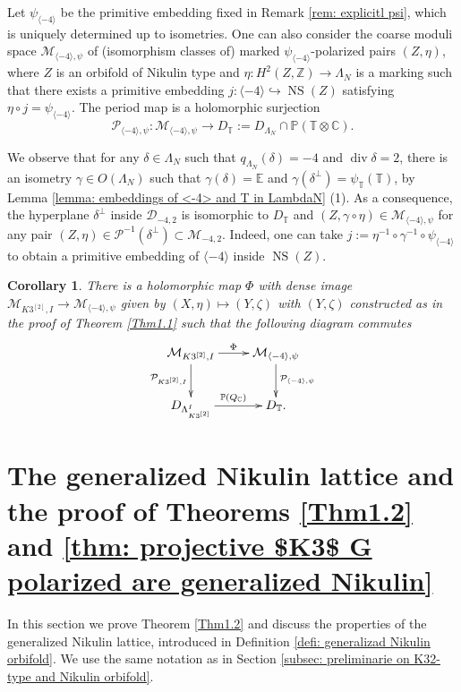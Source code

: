 \documentclass{amsart}
\newtheorem{corollary}[thm]{Corollary}
\theoremstyle{definition}
\numberwithin{equation}{section}
\numberwithin{equation}{section} \theoremstyle{definition}
\DeclareMathOperator{\NS}{NS}
\DeclareMathOperator{\divi}{div}
\newcommand\C{{\mathbb{C}  }}
\newcommand\Z{\mathbb{Z}}
\begin{document}
Let $\psi_{\langle -4\rangle}$ be the primitive embedding fixed in Remark \ref{rem: explicitl psi}, which is uniquely determined up to isometries. One can also consider the coarse moduli space $\mathcal{M}_{\langle -4\rangle,\psi}$ of (isomorphism classes of) marked $\psi_{\langle -4\rangle}$-polarized pairs $(Z,\eta)$, where $Z$ is an orbifold of Nikulin type and $\eta:H^2(Z,\Z)\rightarrow \Lambda_N$ is a marking such that there exists a primitive embedding $j:\langle -4\rangle\hookrightarrow \NS(Z)$ satisfying $\eta\circ j=\psi_{\langle -4\rangle}$. The period map is a holomorphic surjection $$\mathcal{P}_{\langle -4\rangle,\psi}:\mathcal{M}_{\langle -4\rangle,\psi}\rightarrow D_{\mathbb{T}}:=D_{\Lambda_{N}}\cap\mathbb{P}(\mathbb{T}\otimes\mathbb{C}).$$

We observe that for any $\delta\in\Lambda_N$ such that $q_{\Lambda_N}(\delta)=-4$ and $\divi\delta=2$, there is an isometry $\gamma\in O(\Lambda_N)$ such that $\gamma(\delta)=\mathbb{E}$ and $\gamma(\delta^\perp)=\psi_{\mathbb{T}}(\mathbb{T})$, by Lemma \ref{lemma: embeddings of <-4> and T in LambdaN} (1). As a consequence, the hyperplane $\delta^\perp$ inside $\mathcal{D}_{-4,2}$ is isomorphic to $D_{\mathbb{T}}$ and   $(Z,\gamma\circ\eta)\in \mathcal{M}_{\langle -4\rangle,\psi}$ for any pair $(Z,\eta)\in\mathcal{P}^{-1}(\delta^\perp)\subset\mathcal{M}_{-4,2}$. Indeed, one can take $j:=\eta^{-1}\circ\gamma^{-1}\circ \psi_{\langle -4\rangle}$ to obtain a primitive embedding of $\langle -4\rangle$ inside $\NS(Z)$.
\begin{corollary} 
    There is a holomorphic map $\Phi$ with dense image $\mathcal{M}_{K3^{[2]},I}\rightarrow \mathcal{M}_{\langle -4\rangle,\psi}$ given by 
    \(    (X,\eta)\mapsto (Y,\zeta)    \)
    with $(Y,\zeta)$ constructed as in the proof of Theorem \ref{Thm1.1} such that the following diagram commutes
\[\xymatrix{
    \mathcal{M}_{K3^{[2]},I}\ar[r]^\Phi\ar[d]_{\mathcal{P}_{K3^{[2]},I}}  &
\mathcal{M}_{\langle -4\rangle,\psi}\ar[d]^{\mathcal{P}_{\langle -4\rangle,\psi}}\\
    D_{\Lambda_{K3^{[2]}}^I}\ar[r]^{\mathbb{P}(Q_\C)} & D_{\mathbb{T}}.    
    }
    \]    
\end{corollary}


\section{The generalized Nikulin lattice and the proof of Theorems \ref{Thm1.2} and \ref{thm: projective $K3$ G polarized are generalized Nikulin}}\label{section: proofs of 2nd theorem and definition of Generalized Nikulin lattice}
In this section we prove Theorem \ref{Thm1.2} and discuss the properties of the generalized Nikulin lattice, introduced in Definition \ref{defi: generalizad Nikulin orbifold}. We use the same notation as in Section \ref{subsec: preliminarie on K32-type and Nikulin orbifold}.
\end{document}

